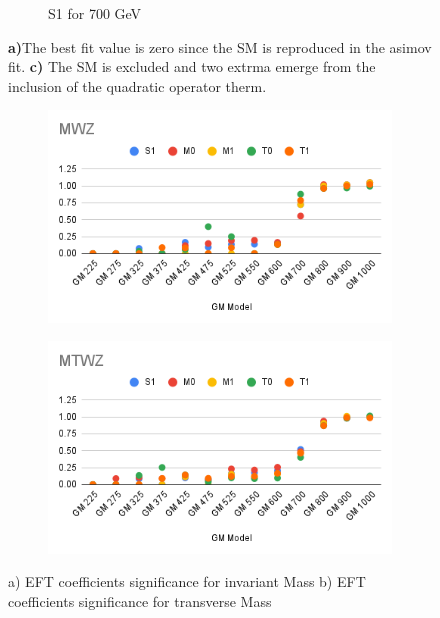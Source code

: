 \documentclass[../Bachelorarbeit.tex]{subfiles}
\begin{document}
\begin{figure}[h]
\begin{subfigure}{0.3\textwidth}
        \caption{S1 for 700 GeV}
    \end{subfigure}
    \caption{\textbf{a)}The best fit value is zero since the SM is reproduced in the asimov fit.
        \textbf{c)} The SM is excluded and two extrma emerge from the inclusion of the quadratic operator therm.}
    \label{fig:EFT_GM_Asimov_comparision}
\end{figure}

\begin{figure}[h]
    \centering
    \begin{subfigure}{0.45\textwidth}
        \includegraphics[width=\textwidth]{Plots/significans/MWZ.png}
        \caption{}
    \end{subfigure}
    \begin{subfigure}{0.45\textwidth}
        \includegraphics[width=\textwidth]{Plots/significans/MTWZ.png}
        \caption{}
    \end{subfigure}
    \caption{a) EFT coefficients significance for invariant Mass b) EFT coefficients significance for transverse Mass}
    \label{fig:significans_plots}
\end{figure}
\end{document}

